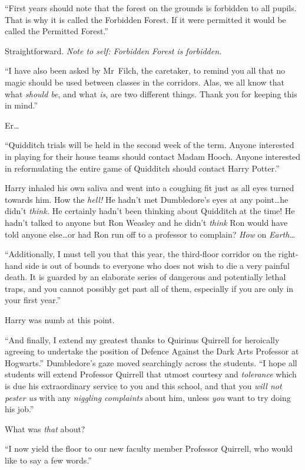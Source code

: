 “First years should note that the forest on the grounds is forbidden to all pupils. That is why it is called the Forbidden Forest. If it were permitted it would be called the Permitted Forest.”

Straightforward. \emph{Note to self: Forbidden Forest is forbidden.}

“I have also been asked by Mr~Filch, the caretaker, to remind you all that no magic should be used between classes in the corridors. Alas, we all know that what \emph{should be}, and what \emph{is}, are two different things. Thank you for keeping this in mind.”

Er…

“Quidditch trials will be held in the second week of the term. Anyone interested in playing for their house teams should contact Madam Hooch. Anyone interested in reformulating the entire game of Quidditch should contact Harry Potter.”

Harry inhaled his own saliva and went into a coughing fit just as all eyes turned towards him. How the \emph{hell!} He hadn’t met Dumbledore’s eyes at any point…he didn’t \emph{think.} He certainly hadn’t been thinking about Quidditch at the time! He hadn’t talked to anyone but Ron Weasley and he didn’t \emph{think} Ron would have told anyone else…or had Ron run off to a professor to complain? \emph{How} on \emph{Earth…}

“Additionally, I must tell you that this year, the third-floor corridor on the right-hand side is out of bounds to everyone who does not wish to die a very painful death. It is guarded by an elaborate series of dangerous and potentially lethal traps, and you cannot possibly get past all of them, especially if you are only in your first year.”

Harry was numb at this point.

“And finally, I extend my greatest thanks to Quirinus Quirrell for heroically agreeing to undertake the position of Defence Against the Dark Arts Professor at Hogwarts.” Dumbledore’s gaze moved searchingly across the students. “I hope all students will extend Professor Quirrell that utmost courtesy and \emph{tolerance} which is due his extraordinary service to you and this school, and that you \emph{will not pester us} with any \emph{niggling complaints} about him, unless \emph{you} want to try doing his job.”

What was \emph{that} about?

“I now yield the floor to our new faculty member Professor Quirrell, who would like to say a few words.”

